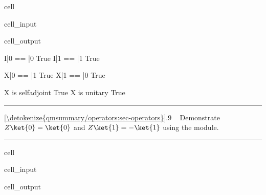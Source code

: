 \documentclass[letterpaper,10pt,english]{jupyterBook}
\begin{document}
\begin{sphinxuseclass}{cell}
\begin{sphinxVerbatimInput}
\begin{sphinxuseclass}{cell_input}
\end{sphinxuseclass}\end{sphinxVerbatimInput}
\begin{sphinxVerbatimOutput}

\begin{sphinxuseclass}{cell_output}
\begin{sphinxVerbatim}[commandchars=\\\{\}]
I|0\PYGZgt{} == |0\PYGZgt{}  True
I|1\PYGZgt{} == |1\PYGZgt{}  True

X|0\PYGZgt{} == |1\PYGZgt{}  True
X|1\PYGZgt{} == |0\PYGZgt{}  True

X is self\PYGZhy{}adjoint  True
X is unitary  True
\end{sphinxVerbatim}

\end{sphinxuseclass}\end{sphinxVerbatimOutput}

\end{sphinxuseclass}

\bigskip\hrule\bigskip


\sphinxAtStartPar
{} \hyperref[\detokenize{qmsummary/operators:sec-operators}]{\ref{\detokenize{qmsummary/operators:sec-operators}}}.9     Demonstrate \(Z\ket{0}=\ket{0}\) and \(Z\ket{1}=-\ket{1}\) using the  module.


\bigskip\hrule\bigskip


\begin{sphinxuseclass}{cell}\begin{sphinxVerbatimInput}

\begin{sphinxuseclass}{cell_input}
\begin{sphinxVerbatim}[commandchars=\\\{\}]
   
\end{sphinxVerbatim}

\end{sphinxuseclass}\end{sphinxVerbatimInput}
\begin{sphinxVerbatimOutput}

\begin{sphinxuseclass}{cell_output}
\noindent{}

\end{sphinxuseclass}\end{sphinxVerbatimOutput}

\end{sphinxuseclass}
\end{document}
